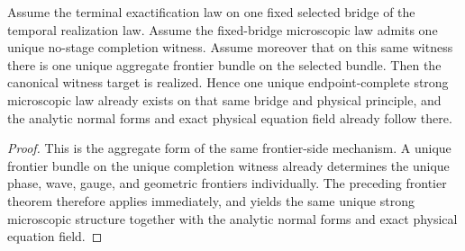 \begin{theorem}
\label{thm:canonical-completion-witness-frontier-bundle-target-implies-canonical-flagship-witness-target}
Assume the terminal exactification law on one fixed selected bridge of the
temporal realization law. Assume the fixed-bridge microscopic law admits one
unique no-stage completion witness. Assume moreover that on this same witness
there is one unique aggregate frontier bundle on the selected bundle.
Then the canonical witness target is realized. Hence one
unique endpoint-complete strong microscopic law already exists on that same
bridge and physical principle, and the analytic normal forms and exact
physical equation field already follow there.
\end{theorem}

\begin{proof}
This is the aggregate form of the same frontier-side mechanism. A unique
frontier bundle on the unique completion witness already determines the unique
phase, wave, gauge, and geometric frontiers individually. The preceding
frontier theorem therefore applies immediately, and yields the same
unique strong microscopic structure together with the analytic normal forms
and exact physical equation field.
\end{proof}

